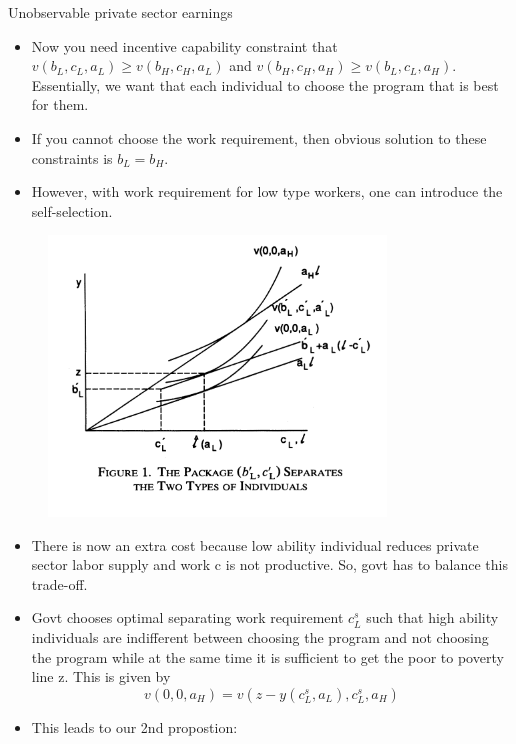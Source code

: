 \documentclass{beamer}
\begin{document}
\begin{frame}[allowframebreaks]{Unobservable private sector earnings }
\begin{itemize}
    \item Now you need incentive capability constraint that $v(b_L,c_L,a_L) \geq v(b_H,c_H,a_L) $ and $v(b_H,c_H,a_H) \geq v(b_L,c_L,a_H)$. Essentially, we want that each individual to choose the program that is best for them.
    \item If you cannot choose the work requirement, then obvious solution to these constraints is $b_L = b_H$. 
    \item However, with work requirement for low type workers, one can introduce the self-selection. 
\end{itemize}




\begin{figure}  
\includegraphics[width=0.8\textwidth]{F1.png}
\end{figure}    

\begin{itemize}
    \item There is now an extra cost because low ability individual reduces private sector labor supply and work c is not productive. So, govt has to balance this trade-off. 
    \item Govt chooses optimal separating work requirement $c^s_L$ such that high ability individuals are indifferent between choosing the program and not choosing the program while at the same time it is sufficient to get the poor to poverty line z. This is given by 
    \[v(0,0,a_H) = v(z-y(c^s_L , a_L), c^s_L,a_H)\]

\item This leads to our 2nd propostion: 


\end{itemize}
\end{frame}
\end{document}
